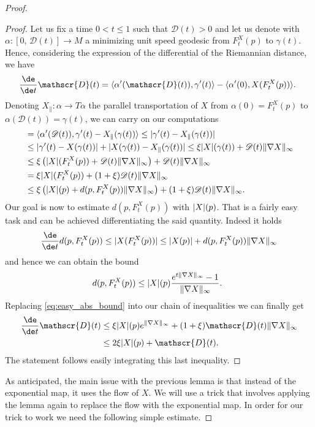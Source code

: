 \documentclass[10pt]{amsart}
\theoremstyle{plain}
\theoremstyle{definition}
\numberwithin{equation}{section}
\newcommand{\D}{\mathscr{D}}
\newcommand{\cc}[2]{\ensuremath{\left[#1,\,#2\right]}}
\newcommand{\fullstop}{\ensuremath{\text{. }}}
\newcommand{\scalprod}[2]{\ensuremath{\langle #1, #2\rangle}}
\newcommand{\Xpar}{X_{\parallel}}
\DeclarePairedDelimiter\abs{\lvert}{\rvert}
\DeclarePairedDelimiter\norm{\lVert}{\rVert}
\begin{document}
\begin{proof}
\begin{proof}
Let us fix a time $0<t\le 1$ such that $\D(t)>0$ and let us denote with \hbox{$\alpha:\cc{0}{\D(t)}\to M$}
a minimizing unit speed geodesic from $F_t^X(p)$ to $\gamma(t)$.
Hence, considering the expression of the differential of the Riemannian distance, we have
\begin{equation*}
\frac{\de}{\de t}\D(t)
= \scalprod{\alpha'(\D(t))}{\gamma'(t)}-\scalprod{\alpha'(0)}{X(F_t^X(p))}\fullstop
\end{equation*}
Denoting $\Xpar:\alpha\to T\alpha$ the parallel transportation of $X$ from $\alpha(0)=F_t^X(p)$ to
$\alpha(\D(t))=\gamma(t)$, we can carry on our computations
\begin{align*}
&=\scalprod{\alpha'(\D(t))}{\gamma'(t)-\Xpar(\gamma(t))}
\le \abs{\gamma'(t)-\Xpar(\gamma(t))} \\
&\le \abs{\gamma'(t)-X(\gamma(t))} + \abs{X(\gamma(t))-\Xpar(\gamma(t))}
\le \xi\abs{X}(\gamma(t))+\D(t)\norm{\nabla X}_{\infty} \\
&\le \xi\left(\abs{X}(F_t^X(p))+\D(t)\norm{\nabla X}_{\infty}\right)
+\D(t)\norm{\nabla X}_{\infty}\\
&= \xi\abs{X}(F_t^X(p))+(1+\xi)\D(t)\norm{\nabla X}_{\infty}\\
&\le \xi\left(\abs{X}(p) + d(p,F_t^X(p))\norm{\nabla X}_{\infty}\right)+
(1+\xi)\D(t)\norm{\nabla X}_{\infty}\fullstop
\end{align*}
Our goal is now to estimate $d(p,F_t^X(p))$ with $\abs{X}(p)$.
That is a fairly easy task and can be achieved differentiating the said quantity. Indeed it holds
\begin{equation*}
\frac{\de}{\de t} d(p, F_t^X(p)) \le \abs{X(F_t^X(p))}
\le \abs{X(p)}+d(p, F_t^X(p))\norm{\nabla X}_\infty
\end{equation*}
and hence we can obtain the bound
\begin{equation}\label{eq:easy_abs_bound}
d(p,F_t^X(p))
\le \abs{X}(p)\frac{e^{t\norm{\nabla X}_{\infty}}-1}{\norm{\nabla X}_{\infty}}\fullstop
\end{equation}
Replacing \cref{eq:easy_abs_bound} into our chain of inequalities we can finally get
\begin{align*}
\frac{\de}{\de t}\D(t)
&\le \xi\abs{X}(p)e^{\norm{\nabla X}_{\infty}}
+(1+\xi)\D(t)\norm{\nabla X}_{\infty} \\
&\le 2\xi\abs{X}(p)+\D(t) \fullstop
\end{align*}
The statement follows easily integrating this last inequality.
\end{proof}
As anticipated, the main issue with the previous lemma is that instead of the exponential map, it uses
the flow of $X$. We will use a trick that involves applying the lemma again to replace the
flow with the exponential map. In order for our trick to work we need the following simple estimate.


\end{proof}
\end{document}
